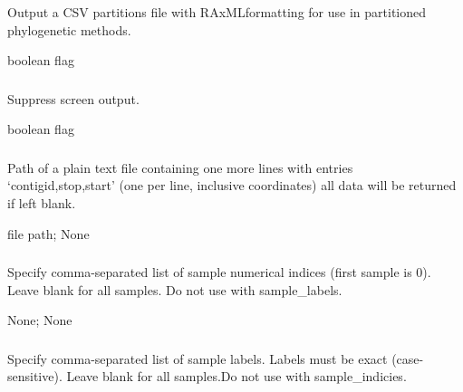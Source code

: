 \documentclass[letterpaper,11pt,english]{sphinxmanual}
\begin{document}
\subsubsection{}
\label{\detokenize{prog_desc:partition}}
 Output a CSV partitions file with RAxMLformatting for use in partitioned phylogenetic methods.

 boolean flag


\subsubsection{}
\label{\detokenize{prog_desc:id28}}
 Suppress screen output.

 boolean flag


\subsubsection{}
\label{\detokenize{prog_desc:id29}}
 Path of a plain text file containing one more lines with entries ‘contigid,stop,start’ (one per line, inclusive coordinates) all data will be returned if left blank.

 file path;  None


\subsubsection{}
\label{\detokenize{prog_desc:id30}}
 Specify comma-separated list of sample numerical indices (first sample is 0). Leave blank for all samples. Do not use with \textendash{}sample\_labels.

 None;  None


\subsubsection{}
\label{\detokenize{prog_desc:id31}}
 Specify comma-separated list of sample labels. Labels must be exact (case-sensitive). Leave blank for all samples.Do not use with \textendash{}sample\_indicies.
\end{document}
